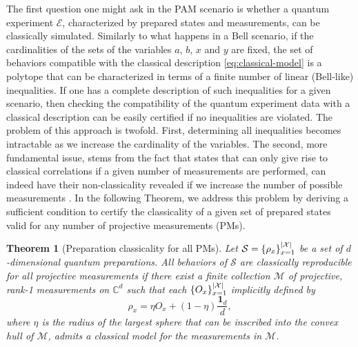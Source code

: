 \documentclass[a4paper,preprintnumbers,floatfix,superscriptaddress,pra,twocolumn,showpacs,notitlepage,longbibliography]{revtex4-2}
\newtheorem{thm}{Theorem}[]
\begin{document}
    The first question one might ask in the PAM scenario is whether a quantum experiment $\mathcal{E}$, characterized by prepared states and measurements, can be classically simulated. Similarly to what happens in a Bell scenario, if the cardinalities of the sets of the variables $a$, $b$, $x$ and $y$ are fixed, the set of behaviors compatible with the classical description \eqref{eq:classical-model} is a polytope that can be characterized in terms of a finite number of linear (Bell-like) inequalities. If one has a complete description of such inequalities for a given scenario, then checking the compatibility of the quantum experiment data with a classical description can be easily certified if no inequalities are violated. The problem of this approach is twofold. First, determining all inequalities becomes intractable as we increase the cardinality of the variables. The second, more fundamental issue, stems from the fact that states that can only give rise to classical correlations if a given number of measurements are performed, can indeed have their non-classicality revealed if we increase the number of possible measurements \cite{Poderini2020}. In the following Theorem, we address this problem by deriving a sufficient condition to certify the classicality of a given set of prepared states valid for any number of projective measurements (PMs).
    \begin{thm}[Preparation classicality for all PMs]
        Let $\mathcal{S} = \{ \rho_x \}_{x=1}^{\abs{\mathcal{X}}}$ be a set of $d$-dimensional quantum preparations. All behaviors of $\mathcal{S}$ are classically reproducible for all projective measurements if there exist a finite collection $\mathcal{M}$ of projective, rank-1 measurements on $\mathbb{C}^d$ such that each $\{ O_x \}_{x=1}^{\abs{\mathcal{X}}}$ implicitly defined by
        \[\rho_x = \eta O_x + (1 - \eta) \frac{\bm{1}_d}{d} ,\]
        where $\eta$ is the radius of the largest sphere that can be inscribed into the convex hull of $\mathcal{M}$, admits a classical model for the measurements in $\mathcal{M}$.
        
        \label{thm:projective}
    \end{thm}
\end{document}
